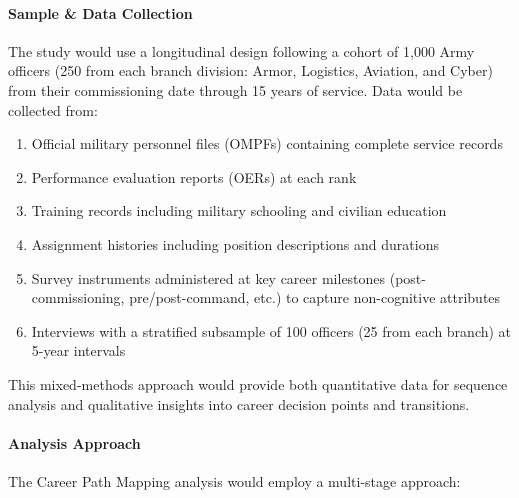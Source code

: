 \documentclass[./main.tex]{subfiles}
\begin{document}
\paragraph{Sample \& Data Collection}\label{sample-data-collection}

The study would use a longitudinal design following a cohort of 1,000
Army officers (250 from each branch division: Armor, Logistics,
Aviation, and Cyber) from their commissioning date through 15 years of
service. Data would be collected from:

\begin{enumerate}
\def\labelenumi{\arabic{enumi}.}
\tightlist
\item
  Official military personnel files (OMPFs) containing complete service
  records
\item
  Performance evaluation reports (OERs) at each rank
\item
  Training records including military schooling and civilian education
\item
  Assignment histories including position descriptions and durations
\item
  Survey instruments administered at key career milestones
  (post-commissioning, pre/post-command, etc.) to capture non-cognitive
  attributes
\item
  Interviews with a stratified subsample of 100 officers (25 from each
  branch) at 5-year intervals
\end{enumerate}

This mixed-methods approach would provide both quantitative data for
sequence analysis and qualitative insights into career decision points
and transitions.

\paragraph{Analysis Approach}\label{analysis-approach}

The Career Path Mapping analysis would employ a multi-stage approach:
\end{document}
